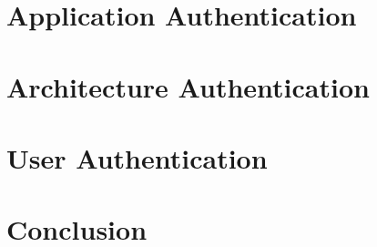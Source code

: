 \documentclass[10pt,journal,compsoc]{IEEEtran}
\begin{document}
\IEEEdisplaynontitleabstractindextext

\IEEEpeerreviewmaketitle




\section{Application Authentication\label{sec:application}}



\section{Architecture Authentication\label{sec:architecture}}



\section{User Authentication\label{sec:user}}



\section{Conclusion\label{sec:conclusion}}



\newpage


\end{document}
